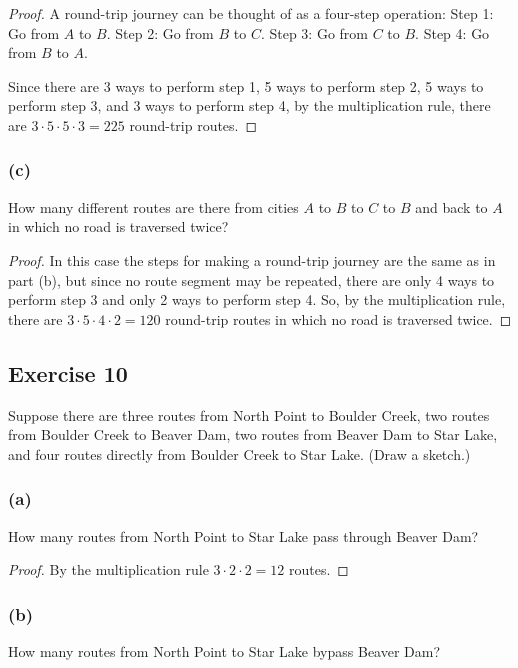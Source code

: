 \documentclass[14pt]{extarticle}
\newcommand{\cy}{\color{cyan}}
\begin{document}
\begin{proof}
A round-trip journey can be thought of as a four-step operation: {\cy Step 1:} Go from $A$ to $B$. {\cy Step 2:} 
Go from $B$ to $C$. {\cy Step 3:} Go from $C$ to $B$. {\cy Step 4:} Go from $B$ to $A$.

Since there are 3 ways to perform step 1, 5 ways to perform step 2, 5 ways to perform step 3, and 3 ways to perform 
step 4, by the multiplication rule, there are \(3 \cdot 5 \cdot 5 \cdot 3 = 225\) round-trip routes.
\end{proof}

\subsubsection{(c)}
How many different routes are there from cities $A$ to $B$ to $C$ to $B$ and back to $A$ in which no road is traversed twice?

\begin{proof}
In this case the steps for making a round-trip journey are the same as in part (b), but since no route segment may be 
repeated, there are only 4 ways to perform step 3 and only 2 ways to perform step 4. So, by the multiplication rule, 
there are \(3 \cdot 5 \cdot 4 \cdot 2 = 120\) round-trip routes in which no road is traversed twice.
\end{proof}

\subsection{Exercise 10}
Suppose there are three routes from North Point to Boulder Creek, two routes from Boulder Creek to Beaver Dam, two 
routes from Beaver Dam to Star Lake, and four routes directly from Boulder Creek to Star Lake. (Draw a sketch.)

\subsubsection{(a)}
How many routes from North Point to Star Lake pass through Beaver Dam?

\begin{proof}
By the multiplication rule \(3 \cdot 2 \cdot 2 = 12\) routes.
\end{proof}

\subsubsection{(b)}
How many routes from North Point to Star Lake bypass Beaver Dam?
\end{document}
